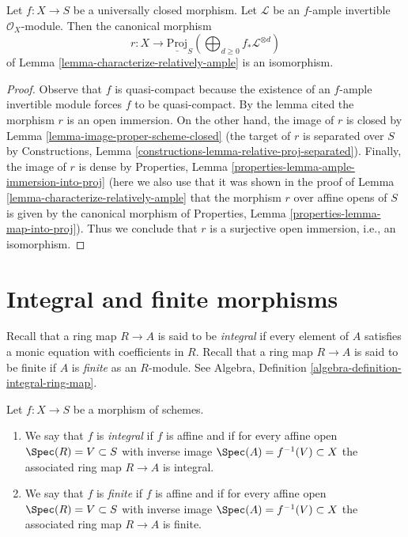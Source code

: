 \begin{lemma}
\label{lemma-proper-ample-is-proj}
Let $f : X \to S$ be a universally closed morphism.
Let $\mathcal{L}$ be an $f$-ample invertible $\mathcal{O}_X$-module.
Then the canonical morphism
$$
r : X
\longrightarrow
\underline{\text{Proj}}_S
\left(
\bigoplus\nolimits_{d \geq 0} f_*\mathcal{L}^{\otimes d}
\right)
$$
of Lemma \ref{lemma-characterize-relatively-ample} is an isomorphism.
\end{lemma}

\begin{proof}
Observe that $f$ is quasi-compact because the existence
of an $f$-ample invertible module forces $f$ to be quasi-compact.
By the lemma cited the morphism $r$ is an open immersion.
On the other hand, the image of $r$ is closed by
Lemma \ref{lemma-image-proper-scheme-closed}
(the target of $r$ is separated over $S$ by Constructions,
Lemma \ref{constructions-lemma-relative-proj-separated}).
Finally, the image of $r$ is dense by
Properties, Lemma \ref{properties-lemma-ample-immersion-into-proj}
(here we also use that it was shown in the proof of
Lemma \ref{lemma-characterize-relatively-ample}
that the morphism $r$ over affine opens of $S$
is given by the canonical morphism of
Properties, Lemma \ref{properties-lemma-map-into-proj}).
Thus we conclude that $r$ is a surjective open immersion, i.e.,
an isomorphism.
\end{proof}












\section{Integral and finite morphisms}
\label{section-integral}

\noindent
Recall that a ring map $R \to A$ is said to be {\it integral}
if every element of $A$ satisfies a monic equation with
coefficients in $R$. Recall that a ring map $R \to A$ is
said to be finite if $A$ is {\it finite} as an $R$-module.
See Algebra, Definition \ref{algebra-definition-integral-ring-map}.

\begin{definition}
\label{definition-integral}
Let $f : X \to S$ be a morphism of schemes.
\begin{enumerate}
\item We say that $f$ is {\it integral} if $f$ is affine
and if for every affine open $\Spec(R) = V \subset S$
with inverse image $\Spec(A) = f^{-1}(V) \subset X$
the associated ring map $R \to A$ is integral.
\item We say that $f$ is {\it finite} if $f$ is affine
and if for every affine open $\Spec(R) = V \subset S$
with inverse image $\Spec(A) = f^{-1}(V) \subset X$
the associated ring map $R \to A$ is finite.
\end{enumerate}
\end{definition}

